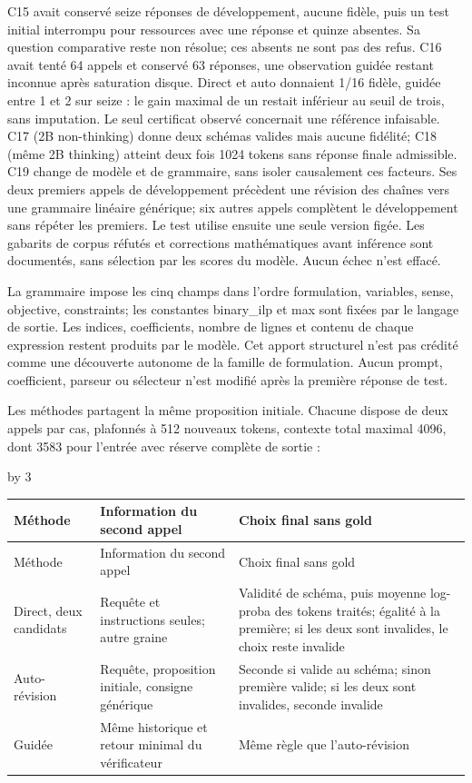 \documentclass[11pt]{article}
\newlength{\QAcolumnwidth}
\begin{document}
C15 avait conservé seize réponses de développement, aucune fidèle, puis un test initial interrompu pour ressources avec une réponse et quinze absentes. Sa question comparative reste non résolue; ces absents ne sont pas des refus. C16 avait tenté 64 appels et conservé 63 réponses, une observation guidée restant inconnue après saturation disque. Direct et auto donnaient 1/16 fidèle, guidée entre 1 et 2 sur seize : le gain maximal de un restait inférieur au seuil de trois, sans imputation. Le seul certificat observé concernait une référence infaisable. C17 (2B non-thinking) donne deux schémas valides mais aucune fidélité; C18 (même 2B thinking) atteint deux fois 1024 tokens sans réponse finale admissible. C19 change de modèle et de grammaire, sans isoler causalement ces facteurs. Ses deux premiers appels de développement précèdent une révision des chaînes vers une grammaire linéaire générique; six autres appels complètent le développement sans répéter les premiers. Le test utilise ensuite une seule version figée. Les gabarits de corpus réfutés et corrections mathématiques avant inférence sont documentés, sans sélection par les scores du modèle. Aucun échec n’est effacé.

La grammaire impose les cinq champs dans l'ordre formulation, variables, sense, objective, constraints; les constantes binary\_ilp et max sont fixées par le langage de sortie. Les indices, coefficients, nombre de lignes et contenu de chaque expression restent produits par le modèle. Cet apport structurel n'est pas crédité comme une découverte autonome de la famille de formulation. Aucun prompt, coefficient, parseur ou sélecteur n'est modifié après la première réponse de test.

Les méthodes partagent la même proposition initiale. Chacune dispose de deux appels par cas, plafonnés à 512 nouveaux tokens, contexte total maximal 4096, dont 3583 pour l’entrée avec réserve complète de sortie :

\begingroup
\small
\setlength{\tabcolsep}{3pt}
\setlength{\QAcolumnwidth}{\dimexpr\linewidth-4\tabcolsep\relax}
\divide\QAcolumnwidth by 3
\begin{longtable}{@{}>{\raggedright\arraybackslash}p{\QAcolumnwidth}>{\raggedright\arraybackslash}p{\QAcolumnwidth}>{\raggedright\arraybackslash}p{\QAcolumnwidth}@{}}
\hline
Méthode & Information du second appel & Choix final sans gold\\
\hline
\endfirsthead
\hline
Méthode & Information du second appel & Choix final sans gold\\
\hline
\endhead
\hline
\endfoot
\hline
\endlastfoot
Direct, deux candidats & Requête et instructions seules; autre graine & Validité de schéma, puis moyenne log-proba des tokens traités; égalité à la première; si les deux sont invalides, le choix reste invalide\\
Auto-révision & Requête, proposition initiale, consigne générique & Seconde si valide au schéma; sinon première valide; si les deux sont invalides, seconde invalide\\
Guidée & Même historique et retour minimal du vérificateur & Même règle que l'auto-révision\\
\end{longtable}
\endgroup
\end{document}
